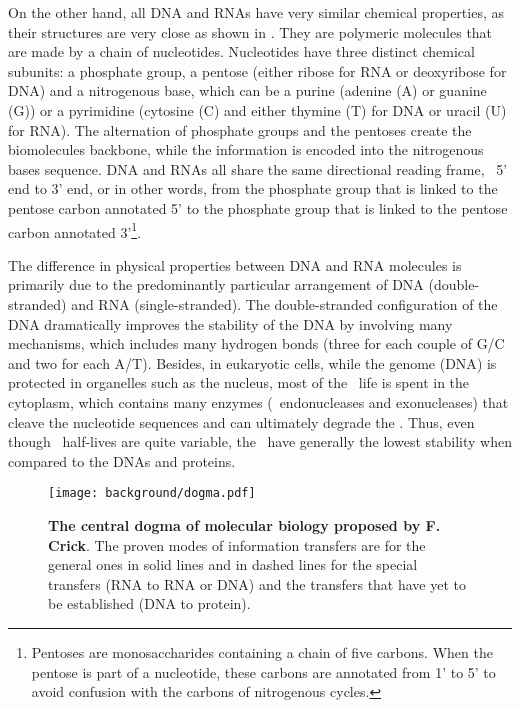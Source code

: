 On the other hand,
all \gls{DNA} and \glspl{RNA} have very similar chemical properties,
as their structures are very close as shown in .
They are polymeric molecules that are made by a chain of nucleotides.
Nucleotides have three distinct chemical subunits: a phosphate group,
a pentose (either ribose for \gls{RNA} or deoxyribose for \gls{DNA})
and a nitrogenous base, which can be a purine (adenine (A) or guanine (G))
or a pyrimidine (cytosine (C) and
either thymine (T) for \gls{DNA} or uracil (U) for \gls{RNA}).
The alternation of phosphate groups and the pentoses create the biomolecules backbone,
while the information is encoded into the nitrogenous bases sequence.
\gls{DNA} and \glspl{RNA} all share the same directional reading frame,
\ie\ 5' end to 3' end, or in other words,
from the phosphate group that is linked to the pentose carbon annotated 5'
to the phosphate group
that is linked to the pentose carbon annotated 3'\footnote{%
Pentoses are monosaccharides containing a chain of five carbons.
When the pentose is part of a nucleotide,
these carbons are annotated from 1' to 5' to avoid confusion
with the carbons of nitrogenous cycles.}.~\mybr\

The difference in physical properties between \gls{DNA} and
\gls{RNA} molecules is primarily due to
the predominantly particular arrangement of \gls{DNA} (double-stranded) and
\gls{RNA} (single-stranded).
The double-stranded configuration of the \gls{DNA} dramatically improves
the stability of the \gls{DNA} by involving many mechanisms,
which includes many hydrogen bonds
(three for each couple of G/C and two for each A/T).
Besides,
in eukaryotic cells,
while the genome (\gls{DNA}) is protected in organelles such as the nucleus,
most of the \mRNAs\ life is spent in the cytoplasm,
which contains many enzymes (\eg\ endonucleases and exonucleases)
that cleave the nucleotide sequences and can ultimately degrade the \mRNAs.
Thus, even though \mRNAs\ half-lives are quite variable,
the \mRNAs\ have generally the lowest stability
when compared to the \glspl{DNA} and proteins.~\mybr\

\begin{figure}[!htbp]
    \texttt{[image: background/dogma.pdf]}\centering
    \vspace{-4mm}
    \caption[Central dogma of molecular biology proposed by F. Crick]%
    {\label{fig:dogma}\textbf{The central dogma of molecular biology proposed by
    F. Crick}. The proven modes of information transfers are for the general ones
    in solid lines and in dashed lines for the special transfers
    (\gls{RNA} to \gls{RNA} or \gls{DNA}) and the transfers that have yet to
    be established (\gls{DNA} to protein).
    }
\end{figure}

